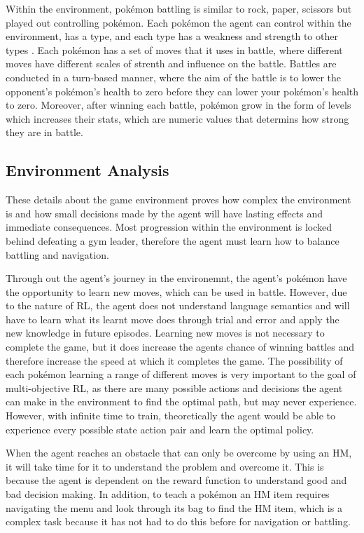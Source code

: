 Within the environment, pokémon battling is similar to rock, paper, scissors but played out controlling pokémon. Each pokémon the agent can control within the environment, has a type, and each type has a weakness and strength to other types \cite{SerebiiTeam2016}. Each pokémon has a set of moves that it uses in battle, where different moves have different scales of strenth and influence on the battle. Battles are conducted in a turn-based manner, where the aim of the battle is to lower the opponent's pokémon's health to zero before they can lower your pokémon's health to zero. Moreover, after winning each battle, pokémon grow in the form of levels which increases their stats, which are numeric values that determins how strong they are in battle. 


\subsection{Environment Analysis}

These details about the game environment proves how complex the environment is and how small decisions made by the agent will have lasting effects and immediate consequences. Most progression within the environment is locked behind defeating a gym leader, therefore the agent must learn how to balance battling and navigation. 

Through out the agent's journey in the environemnt, the agent's pokémon have the opportunity to learn new moves, which can be used in battle. However, due to the nature of RL, the agent does not understand language semantics and will have to learn what its learnt move does through trial and error and apply the new knowledge in future episodes. Learning new moves is not necessary to complete the game, but it does increase the agents chance of winning battles and therefore increase the speed at which it completes the game. The possibility of each pokémon learning a range of different moves is very important to the goal of multi-objective RL, as there are many possible actions and decisions the agent can make in the environment to find the optimal path, but may never experience. However, with infinite time to train, theoretically the agent would be able to experience every possible state action pair and learn the optimal policy. 

When the agent reaches an obstacle that can only be overcome by using an HM, it will take time for it to understand the problem and overcome it. This is because the agent is dependent on the reward function to understand good and bad decision making. In addition, to teach a pokémon an HM item requires navigating the menu and look through its bag to find the HM item, which is a complex task because it has not had to do this before for navigation or battling.

